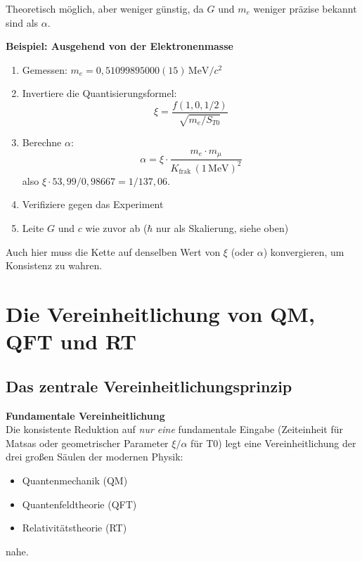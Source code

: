 	Theoretisch möglich, aber weniger günstig, da $G$ und $m_e$ weniger präzise bekannt sind als $\alpha$.
	
	\textbf{Beispiel: Ausgehend von der Elektronenmasse}
	
	\begin{enumerate}
		\item Gemessen: $m_e = 0{,}51099895000(15)\,\text{MeV}/c^2$
		
		\item Invertiere die Quantisierungsformel:
		\[
		\xi = \frac{f(1,0,1/2)}{\sqrt{m_e / S_{T0}}}
		\]
		
		\item Berechne $\alpha$:
		\[
		\alpha = \xi \cdot \frac{m_e \cdot m_\mu}{K_{\text{frak}}\,(1\,\text{MeV})^2}
		\]
		also $\xi \cdot 53{,}99/0{,}98667 = 1/137{,}06$.
		
		\item Verifiziere gegen das Experiment
		
		\item Leite $G$ und $c$ wie zuvor ab ($\hbar$ nur als Skalierung, siehe oben)
	\end{enumerate}
	
	Auch hier muss die Kette auf denselben Wert von $\xi$ (oder $\alpha$) konvergieren, um Konsistenz zu wahren.
	
	\section{Die Vereinheitlichung von QM, QFT und RT}
	
	\subsection{Das zentrale Vereinheitlichungsprinzip}
	
	\begin{keyresult}
		\textbf{Fundamentale Vereinheitlichung}\\
		Die konsistente Reduktion auf \emph{nur eine} fundamentale Eingabe (Zeiteinheit für Matsas oder geometrischer Parameter $\xi/\alpha$ für T0) legt eine Vereinheitlichung der drei großen Säulen der modernen Physik:
		\begin{itemize}
			\item Quantenmechanik (QM)
			\item Quantenfeldtheorie (QFT)
			\item Relativitätstheorie (RT)
		\end{itemize}
		nahe.
	\end{keyresult}
	
